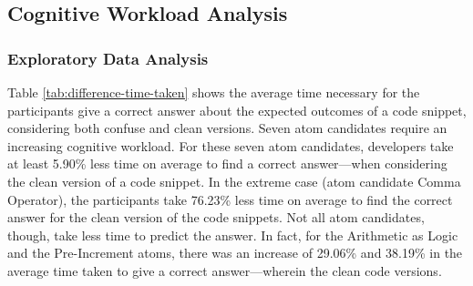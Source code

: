 \subsection{Cognitive Workload Analysis}

\subsubsection*{Exploratory Data Analysis}
Table \ref{tab:difference-time-taken} shows the average time necessary for the participants give a correct answer about the expected outcomes of a code snippet, considering both confuse and clean versions. Seven atom candidates require an increasing cognitive workload. For these seven atom candidates, developers take at least 5.90\% less time on average to find a correct answer---when considering the clean version of a code snippet. In the extreme case (atom candidate Comma Operator), the participants take 76.23\% less
time on average to find the correct answer for the clean version of the code snippets. 
Not all atom candidates, though, take less time to predict the answer. In fact, for the Arithmetic as Logic and the Pre-Increment atoms, there was an increase
of 29.06\% and 38.19\% in the average time taken to give a correct answer---wherein the clean code versions.

\begin{table}[htbp]
\caption{Time in seconds to submit a correct answer}
\label{tab:difference-time-taken}
\end{table}


